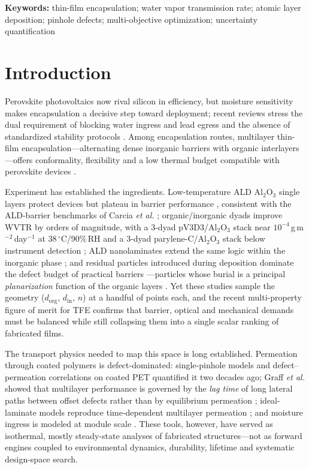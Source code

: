 \documentclass[11pt]{article}
\newcommand{\dorg}{d_{\mathrm{org}}}
\newcommand{\din}{d_{\mathrm{in}}}
\newcommand{\gmd}{g\,m$^{-2}$\,day$^{-1}$}
\begin{document}
\noindent\textbf{Keywords:} thin-film encapsulation; water vapor transmission rate; atomic layer deposition; pinhole defects; multi-objective optimization; uncertainty quantification

\section{Introduction}
Perovskite photovoltaics now rival silicon in efficiency, but moisture sensitivity makes encapsulation a decisive step toward deployment; recent reviews stress the dual requirement of blocking water ingress and lead egress and the absence of standardized stability protocols \cite{dipta2024,acsmatau2022}. Among encapsulation routes, multilayer thin-film encapsulation---alternating dense inorganic barriers with organic interlayers---offers conformality, flexibility and a low thermal budget compatible with perovskite devices \cite{lee2018,choi2018,ramos2018,singh2020,wu2018}.

Experiment has established the ingredients. Low-temperature ALD Al$_2$O$_3$ single layers protect devices but plateau in barrier performance \cite{choi2018,ramos2018,singh2020}, consistent with the ALD-barrier benchmarks of Carcia \emph{et al.} \cite{carcia2006}; organic/inorganic dyads improve WVTR by orders of magnitude, with a 3-dyad pV3D3/Al$_2$O$_3$ stack near $10^{-4}$\,\gmd{} at 38\,$^{\circ}$C/90\%\,RH \cite{lee2018} and a 3-dyad parylene-C/Al$_2$O$_3$ stack below instrument detection \cite{wu2018}; ALD nanolaminates extend the same logic within the inorganic phase \cite{dameron2008}; and residual particles introduced during deposition dominate the defect budget of practical barriers \cite{wu2018}---particles whose burial is a principal \emph{planarization} function of the organic layers \cite{coclite2012}. Yet these studies sample the geometry ($\dorg$, $\din$, $n$) at a handful of points each, and the recent multi-property figure of merit for TFE \cite{fom2025} confirms that barrier, optical and mechanical demands must be balanced while still collapsing them into a single scalar ranking of fabricated films.

The transport physics needed to map this space is long established. Permeation through coated polymers is defect-dominated: single-pinhole models \cite{rossi1993} and defect--permeation correlations on coated PET \cite{dasilva2000} quantified it two decades ago; Graff \emph{et al.} showed that multilayer performance is governed by the \emph{lag time} of long lateral paths between offset defects rather than by equilibrium permeation \cite{graff2004}; ideal-laminate models reproduce time-dependent multilayer permeation \cite{kiese2019}; and moisture ingress is modeled at module scale \cite{kempe2006}. These tools, however, have served as isothermal, mostly steady-state analyses of fabricated structures---not as forward engines coupled to environmental dynamics, durability, lifetime and systematic design-space search.
\end{document}
